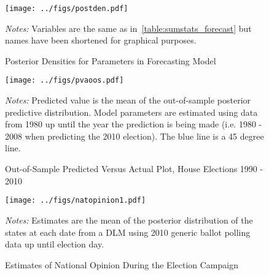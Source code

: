 \documentclass[12pt,final,fleqn]{article}
\theoremstyle{plain}
\begin{document}
\begin{landscape}
\begin{figure}[!ht]
\texttt{[image: ../figs/postden.pdf]}
\vspace{.5cm}
\caption{Posterior Densities for Parameters in Forecasting Model}
\label{fig:Posterior Densities for Parameters in Forecasting Model}
\begin{minipage}{\linewidth}
\footnotesize
\emph{Notes:} Variables are the same as in~\autoref{table:sumstats_forecast} but names have been shortened for graphical purposes. 
\end{minipage}
\end{figure}
\end{landscape}

\iffalse
\begin{figure}[!htb]
\texttt{[image: ../figs/pva.pdf]}
\vspace{.5cm}
\caption{In-Sample Predicted Versus Actual Plot, House Elections 1980 - 2008}
\label{fig:In-Sample Predicted Versus Actual Plot, House Elections 1980 - 2008}
\begin{minipage}{\linewidth}
\footnotesize
\emph{Notes:} Predicted value is the mean of the in-sample posterior predictive distribution ($v^{rep}$). Model parameters are estimated using data from 1980 to 2008. The blue line is a 45 degree line.
\end{minipage}
\end{figure}
\fi

\begin{figure}[!htb]
\texttt{[image: ../figs/pvaoos.pdf]}
\vspace{.5cm}
\caption{Out-of-Sample Predicted Versus Actual Plot, House Elections 1990 - 2010}
\label{fig:predicted_vs_actual}
\begin{minipage}{\linewidth}
\footnotesize
\emph{Notes:} Predicted value is the mean of the out-of-sample posterior predictive distribution. Model parameters are estimated using data from 1980 up until the year the prediction is being made (i.e. 1980 - 2008 when predicting the 2010 election). The blue line is a 45 degree line. 
\end{minipage}
\end{figure}

\begin{figure}[!htb]
\centering
\texttt{[image: ../figs/natopinion1.pdf]}
\vspace{.5cm}
\caption{Estimates of National Opinion During the Election Campaign}
\label{fig:nat_opinion}
\begin{minipage}{\linewidth}
\footnotesize
\emph{Notes:} Estimates are the mean of the posterior distribution of the states at each date from a DLM using 2010 generic ballot polling data up until election day.
\end{minipage}
\end{figure}
\end{document}

